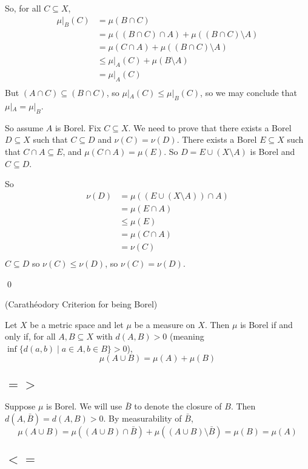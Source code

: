 \documentclass[x11names,reqno,14pt]{extarticle}
\begin{document}
So, for all $C \subseteq X$, 
\begin{align*}
\mu|_B(C) & = \mu(B \cap C)\\
			  & = \mu((B\cap C)\cap A) + \mu((B \cap C) \setminus A) \\
			  & = \mu(C \cap A) + \mu((B \cap C) \setminus A ) \\
			  & \leq \mu|_A(C) + \mu(B\setminus A) \\
			  & = \mu|_A(C) \\
\end{align*}
But $(A \cap C) \subseteq (B \cap C)$, so $\mu|_A(C) \leq \mu|_B(C)$, so we may conclude that $\mu|_A = \mu|_B$. 

So assume $A$ is Borel. Fix $C \subseteq X$. We need to prove that there exists a Borel $D\subseteq X$ such that $C\subseteq D$ and $\nu(C) = \nu(D)$. There exists a Borel $E \subseteq X$ such that $C \cap A \subseteq E$, and $\mu(C \cap A) = \mu(E)$. So $D = E \cup (X\setminus A)$ is Borel and $C \subseteq D$. 

So 
\begin{align*}
\nu(D) & = \mu((E\cup(X\setminus A))\cap A)\\ &  = \mu(E \cap A) \\ & \leq\mu(E) \\
& = \mu(C\cap A) \\
& = \nu(C) \\
\end{align*}
$C \subseteq D$ so $\nu(C)\leq\nu(D)$, so $\nu(C)=\nu(D)$.

\qed

\thm (Carath\'eodory Criterion for being Borel) 

Let $X$ be a metric space and let $\mu$ be a measure on $X$. Then $\mu$ is Borel if and only if, for all $A, B \subseteq X$ with $d(A, B) > 0$ (meaning $\inf\{d(a, b) \mid a \in A, b \in B\} > 0$), 
\[
\mu(A \cup B) = \mu(A) + \mu(B)
\]

\proof

\subsection*{$=>$}

Suppose $\mu$ is Borel. We will use $\bar{B}$ to denote the closure of $B$. Then $d(A,\bar{B}) = d(A, B) > 0$. By measurability of $\bar{B}$, 
\[
\mu(A \cup B) = \mu((A \cup B) \cap \bar{B}) + \mu((A \cup B) \setminus \bar{B}) = \mu(B) = \mu(A)
\]

\subsection*{$<=$}
\end{document}
